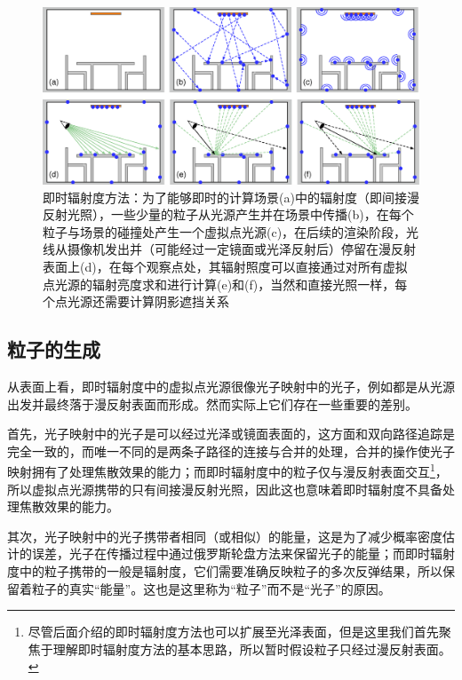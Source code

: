 \begin{figure}
\begin{fullwidth}
	\includegraphics[width=1.0\thewidth ]{figures/ir/instant-radiosity}
	\caption{即时辐射度方法：为了能够即时的计算场景(a)中的辐射度（即间接漫反射光照），一些少量的粒子从光源产生并在场景中传播(b)，在每个粒子与场景的碰撞处产生一个虚拟点光源(c)，在后续的渲染阶段，光线从摄像机发出并（可能经过一定镜面或光泽反射后）停留在漫反射表面上(d)，在每个观察点处，其辐射照度可以直接通过对所有虚拟点光源的辐射亮度求和进行计算(e)和(f)，当然和直接光照一样，每个点光源还需要计算阴影遮挡关系}
	\label{f:ir-instant-radiosity}
\end{fullwidth}
\end{figure}




\subsection{粒子的生成}


从表面上看，即时辐射度中的虚拟点光源很像光子映射中的光子，例如都是从光源出发并最终落于漫反射表面而形成。然而实际上它们存在一些重要的差别。

首先，光子映射中的光子是可以经过光泽或镜面表面的，这方面和双向路径追踪是完全一致的，而唯一不同的是两条子路径的连接与合并的处理，合并的操作使光子映射拥有了处理焦散效果的能力；而即时辐射度中的粒子仅与漫反射表面交互\footnote{尽管后面介绍的即时辐射度方法也可以扩展至光泽表面，但是这里我们首先聚焦于理解即时辐射度方法的基本思路，所以暂时假设粒子只经过漫反射表面。}，所以虚拟点光源携带的只有间接漫反射光照，因此这也意味着即时辐射度不具备处理焦散效果的能力。

其次，光子映射中的光子携带者相同（或相似）的能量，这是为了减少概率密度估计的误差，光子在传播过程中通过俄罗斯轮盘方法来保留光子的能量；而即时辐射度中的粒子携带的一般是辐射度，它们需要准确反映粒子的多次反弹结果，所以保留着粒子的真实“能量”。这也是这里称为“粒子”而不是“光子”的原因。

